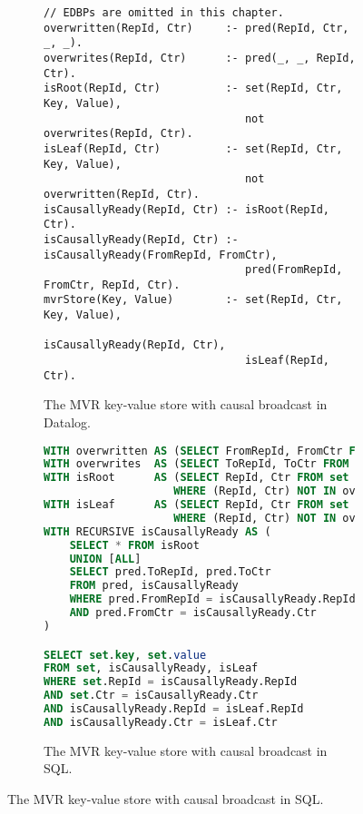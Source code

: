 \begin{figure}[tpb]
	\begin{subfigure}[b]{\textwidth}
		\begin{lstlisting}[keepspaces]
// EDBPs are omitted in this chapter.
overwritten(RepId, Ctr)     :- pred(RepId, Ctr, _, _).
overwrites(RepId, Ctr)      :- pred(_, _, RepId, Ctr).
isRoot(RepId, Ctr)          :- set(RepId, Ctr, Key, Value),
                               not overwrites(RepId, Ctr).
isLeaf(RepId, Ctr)          :- set(RepId, Ctr, Key, Value),
                               not overwritten(RepId, Ctr).
isCausallyReady(RepId, Ctr) :- isRoot(RepId, Ctr).
isCausallyReady(RepId, Ctr) :- isCausallyReady(FromRepId, FromCtr),
                               pred(FromRepId, FromCtr, RepId, Ctr).
mvrStore(Key, Value)        :- set(RepId, Ctr, Key, Value),
                               isCausallyReady(RepId, Ctr),
                               isLeaf(RepId, Ctr).\end{lstlisting}
		\caption{The \ac{MVR} key-value store with causal broadcast in Datalog.}\label{code:mvr-crdt-datalog}
	\end{subfigure}

	\vspace{1em}

	\begin{subfigure}[b]{\textwidth}
		\begin{lstlisting}[language=SQL]
WITH overwritten AS (SELECT FromRepId, FromCtr FROM pred)
WITH overwrites  AS (SELECT ToRepId, ToCtr FROM pred)
WITH isRoot      AS (SELECT RepId, Ctr FROM set
                    WHERE (RepId, Ctr) NOT IN overwrites)
WITH isLeaf      AS (SELECT RepId, Ctr FROM set
                    WHERE (RepId, Ctr) NOT IN overwritten)
WITH RECURSIVE isCausallyReady AS (
    SELECT * FROM isRoot
    UNION [ALL]
    SELECT pred.ToRepId, pred.ToCtr
    FROM pred, isCausallyReady
    WHERE pred.FromRepId = isCausallyReady.RepId
    AND pred.FromCtr = isCausallyReady.Ctr
)

SELECT set.key, set.value
FROM set, isCausallyReady, isLeaf
WHERE set.RepId = isCausallyReady.RepId
AND set.Ctr = isCausallyReady.Ctr
AND isCausallyReady.RepId = isLeaf.RepId
AND isCausallyReady.Ctr = isLeaf.Ctr\end{lstlisting}
		\caption{The \ac{MVR} key-value store with causal broadcast in SQL.}\label{code:mvr-crdt-sql}
	\end{subfigure}
\end{figure}


